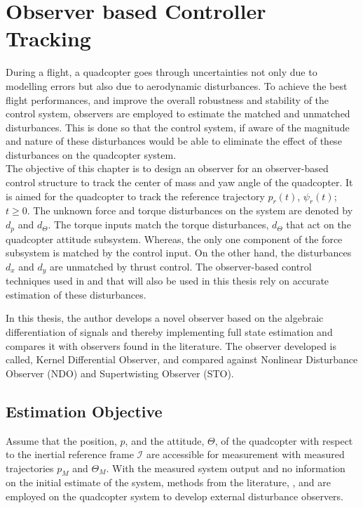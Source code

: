 \documentclass[letterpaper%
, twoside%
, 12pt%
,memoire%
, english%
,creativecommons,hyperref%
]{thETS}
\begin{document}
\chapter{Observer based Controller Tracking} \label{Chap:Observers}
During a flight, a quadcopter goes through uncertainties not only due to modelling errors but also due to aerodynamic disturbances. To achieve the best flight performances, and improve the overall robustness and stability of the control system, observers are employed to estimate the matched and unmatched disturbances. This is done so that the control system, if aware of the magnitude and nature of these disturbances would be able to eliminate the effect of these disturbances on the quadcopter system.  \\
The objective of this chapter is to design an observer for an observer-based control structure to track the center of mass and yaw angle of the quadcopter. It is aimed for the quadcopter to track the reference trajectory $p_r(t)$, $\psi_r(t)$; $t\geq 0$. The unknown force and torque disturbances on the system are denoted by $d_p$ and $d_\Theta$. The torque inputs match the torque disturbances, $d_\Theta$ that act on the quadcopter attitude subsystem. Whereas, the only one component of the force subsystem is matched by the control input. On the other hand, the disturbances $d_x$ and $d_y$ are unmatched by thrust control. The observer-based control techniques used in \citep{RN114} and \citep{RN117} that will also be used in this thesis rely on accurate estimation of these disturbances. 

In this thesis, the author develops a novel observer based on the algebraic differentiation of signals and thereby implementing full state estimation and compares it with observers found in the literature. The observer developed is called, Kernel Differential Observer, and compared against Nonlinear Disturbance Observer (NDO) and Supertwisting Observer (STO).

\section{Estimation Objective}
Assume that the position, $p$, and the attitude, $\Theta$, of the quadcopter with respect to the inertial reference frame $\mathcal{I}$ are accessible for measurement with measured trajectories $p_{M}$ and $\Theta_{M}$. With the measured system output and no information on the initial estimate of the system, methods from the literature, \citep{RN114}, \citep{RN117} and \citep{RN83} are employed on the quadcopter system to develop external disturbance observers.
\end{document}
